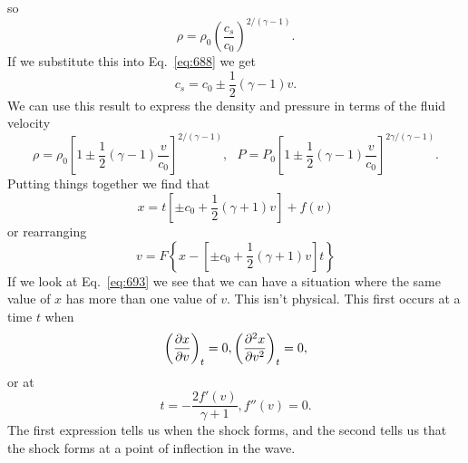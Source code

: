 {\begin{equation}
\end{equation}
so
\begin{equation}
\rho = \rho_0 \left ( \frac{c_s}{c_0} \right )^{2/(\gamma-1)}.
\label{eq:689}
\end{equation}
If we substitute this into Eq.~\ref{eq:688} we get
\begin{equation}
c_s = c_0 \pm \frac{1}{2} (\gamma -1 ) v.
\label{eq:690}
\end{equation}
We can use this result to express the density and pressure in terms of
the fluid velocity
\begin{equation}
\rho = \rho_0 \left [ 1 \pm \frac{1}{2} (\gamma-1) \frac{v}{c_0}
  \right]^{2/(\gamma-1)}, ~~~ P = P_0
\left [ 1 \pm \frac{1}{2} (\gamma-1) \frac{v}{c_0}
  \right]^{2\gamma/(\gamma-1)}.
\label{eq:691}
\end{equation}
Putting things together we find that
\begin{equation}
x = t \left [ \pm c_0 + \frac{1}{2} (\gamma+1) v \right ] + f(v)
\label{eq:692}
\end{equation}
or rearranging
\begin{equation}
v = F \left \{ x - \left [ \pm c_0 + \frac{1}{2} (\gamma+1) v \right ]
t \right \}
\label{eq:693}
\end{equation}
If we look at Eq.~\ref{eq:693} we see that we can have a situation where the
same value of $x$ has more than one value of $v$.  This isn't
physical.  This first occurs at a time $t$ when
\begin{equation}
\left ( \frac{\partial {x}}{\partial {v}} \right)_t = 0, \left ( \frac{\partial {^2x}}{\partial {v^2}} \right)_t = 0, 
\label{eq:694}
\end{equation}
or at
\begin{equation}
t = -\frac{2 f'(v)}{\gamma+1}, f''(v) = 0.
\label{eq:695}
\end{equation}
The first expression tells us when the shock forms, and the second
tells us that the shock forms at a point of inflection in the wave.

}
